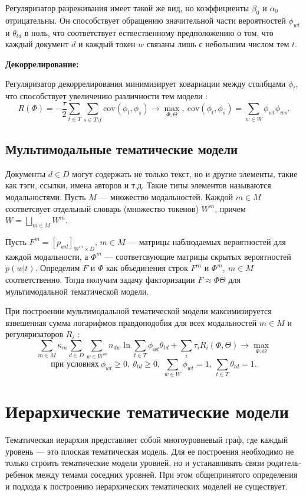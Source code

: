 Регуляризатор разреживания имеет такой же вид, но коэффициенты $\beta_0$ и $\alpha_0$ отрицательны. Он способствует обращению значительной части вероятностей $\phi_{wt}$ и $\theta_{td}$ в ноль, что соответствует ествественному предположению о том, что каждый документ $d$ и каждый токен $w$ связаны лишь с небольшим числом тем $t$.


\textbf{Декоррелирование:}

Регуляризатор декоррелирования минимизирует ковариации между столбцами $\phi_{t}$, что способствует увеличению различности тем модели \cite{ARTM4}:
$$ R(\Phi) = -\dfrac{\tau}{2}\sum_{t \in T}\sum_{s \in T\setminus t} \text{cov}(\phi_t, \phi_s) \rightarrow 
\max\limits_{\Phi, \Theta}, \  \text{cov}(\phi_t, \phi_s) = \sum_{w \in W}\phi_{wt}\phi_{ws}.$$

\subsection{Мультимодальные тематические модели}
Документы $d \in D$ могут содержать не только текст, но и другие элементы, такие как тэги, ссылки, имена авторов и т.д. Такие типы элементов называются модальностями. Пусть $M$ --- множество модальностей. Каждой $m \in M$ соответсвует отдельный словарь (множество токенов)  $W^m$, причем $W = \bigsqcup\limits_{m \in M} W^m $.

Пусть $F^m=[p_{wd}]_{W^m \times D}$, $m \in M$ --- матрицы наблюдаемых вероятностей для каждой модальности, а $\Phi^m$ --- соответсвующие матрицы скрытых вероятностей $p(w|t)$. Определим $F$ и $\Phi$ как объединения строк $F^m$ и $\Phi^m, \ m \in M$ соответственно. Тогда получим задачу факторизации $F \approx \Phi \Theta$ для мультимодальной тематической модели.

При построении мультимодальной тематической модели максимизируется взвешенная сумма логарифмов правдоподобия для всех модальностей $m \in M$ и регуляризаторов $R_i$ \cite{ARTM4}: 
$$ \sum\limits_{m \in M} \kappa_m \sum\limits_{d \in D} \sum\limits_{w \in W^m} n_{dw} \ln{\sum\limits_{t \in T} \phi_{wt}\theta_{td}} + \sum_{i} \tau_i R_i(\Phi, \Theta) \rightarrow 
\max\limits_{\Phi, \Theta}$$
$$ \text{при условиях}  \ \phi_{wt} \geq 0, \ \theta_{td} \geq 0,\ \sum\limits_{w \in W} \phi_{wt} = 1, \ \sum\limits_{t \in T} \theta_{td} = 1.$$




\section{Иерархические тематические модели}
Тематическая иерархия представляет собой многоуровневый граф, где каждый уровень --- это плоская тематическая модель. Для ее построения необходимо не только строить тематические модели уровней, но и устанавливать связи родитель-ребенок между темами соседних уровней. При этом общепринятого определения и подхода к построению иерархических тематических моделей не существует. 

